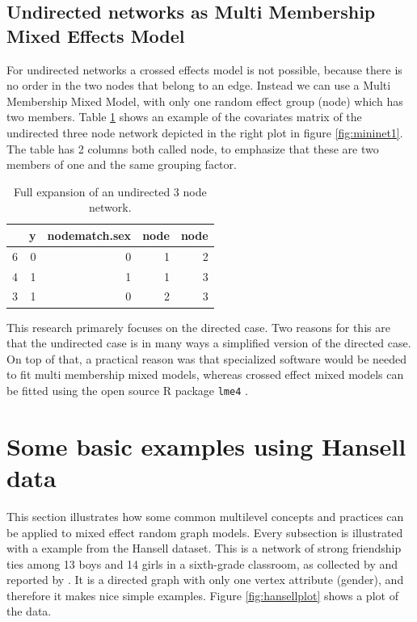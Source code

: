 \documentclass[a4paper]{article}
\begin{document}
\subsection{Undirected networks as Multi Membership Mixed Effects Model}

For undirected networks a crossed effects model is not possible, because there is no order in the two nodes that belong to an edge.
Instead we can use a Multi Membership Mixed Model, with only one random effect group (node) which has two members.
Table \ref{minitable2} shows an example of the covariates matrix of the undirected three node network depicted in the right plot in figure \ref{fig:mininet1}.
The table has 2 columns both called node, to emphasize that these are two members of one and the same grouping factor.

\begin{table}[ht]
\begin{center}
\begin{tabular}{rrrrr}
  \hline
 & y & nodematch.sex & node & node \\ 
  \hline
6 & 0 & 0 & 1 & 2 \\ 
  4 & 1 & 1 & 1 & 3 \\ 
  3 & 1 & 0 & 2 & 3 \\ 
   \hline
\end{tabular}
\caption{Full expansion of an undirected 3 node network.}
\label{minitable2}
\end{center}
\end{table}
This research primarely focuses on the directed case. Two reasons for this are that the undirected case is in many ways a simplified 
version of the directed case. On top of that, a practical reason was that specialized software would be needed to fit multi membership
mixed models, whereas crossed effect mixed models can be fitted using the open source R package \texttt{lme4} \citep{bates2007lme4, rmanual}.

\section{Some basic examples using Hansell data}
\label{section.hansell}

This section illustrates how some common multilevel concepts and practices can be applied to mixed effect random graph models. 
Every subsection is illustrated with a example from the Hansell dataset. 
This is a network of strong friendship ties among 13 boys and 14 girls in a sixth-grade classroom, as collected by \citet{hansell1984cooperative} and reported by \citet{wang1987stochastic}.
It is a directed graph with only one vertex attribute (gender), and therefore it makes nice simple examples. Figure \ref{fig:hansellplot} shows a
plot of the data.
\end{document}
